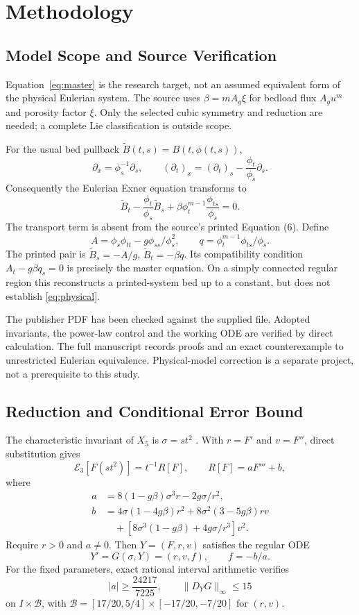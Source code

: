\documentclass[12pt,a4paper]{article}
\newcommand{\E}{\mathcal E}
\begin{document}
\newpage
\section{Methodology}
\subsection{Model Scope and Source Verification}
Equation~\eqref{eq:master} is the research target, not an assumed equivalent form of the physical Eulerian system. The source uses $\beta=mA_g\xi$ for bedload flux $A_gu^m$ and porosity factor $\xi$. Only the selected cubic symmetry and reduction are needed; a complete Lie classification is outside scope.

For the usual bed pullback $\widetilde B(t,s)=B(t,\phi(t,s))$,
\[
\partial_x=\phi_s^{-1}\partial_s,\qquad
(\partial_t)_x=(\partial_t)_s-\frac{\phi_t}{\phi_s}\partial_s.
\]
Consequently the Eulerian Exner equation transforms to
\begin{equation}
\widetilde B_t-\frac{\phi_t}{\phi_s}\widetilde B_s+
\beta\phi_t^{m-1}\frac{\phi_{ts}}{\phi_s}=0.
\label{eq:physical}
\end{equation}
The transport term is absent from the source's printed Equation (6). Define
\[
A=\phi_s\phi_{tt}-g\phi_{ss}/\phi_s^2,\qquad
q=\phi_t^{m-1}\phi_{ts}/\phi_s.
\]
The printed pair is $\widetilde B_s=-A/g$, $\widetilde B_t=-\beta q$.
Its compatibility condition $A_t-g\beta q_s=0$ is precisely the master equation. On a simply connected regular region this reconstructs a printed-system bed up to a constant, but does not establish \eqref{eq:physical}.

The publisher PDF has been checked against the supplied file. Adopted invariants, the power-law control and the working ODE are verified by direct calculation. The full manuscript records proofs and an exact counterexample to unrestricted Eulerian equivalence. Physical-model correction is a separate project, not a prerequisite to this study.

\newpage
\subsection{Reduction and Conditional Error Bound}
The characteristic invariant of $X_5$ is $\sigma=st^2$ \cite{olver}. With $r=F'$ and $v=F''$, direct substitution gives
\begin{equation}
\E_3[F(st^2)]=t^{-1}R[F],\qquad R[F]=aF'''+b,
\label{eq:lift}
\end{equation}
where
\[
\begin{aligned}
a&=8(1-g\beta)\sigma^3r-2g\sigma/r^2,\\
b&=4\sigma(1-4g\beta)r^2+8\sigma^2(3-5g\beta)rv\\
 &\quad+[8\sigma^3(1-g\beta)+4g\sigma/r^3]v^2.
\end{aligned}
\]
Require $r>0$ and $a\ne0$. Then $Y=(F,r,v)$ satisfies the regular ODE
\[
Y'=G(\sigma,Y)=(r,v,f),\qquad f=-b/a.
\]
For the fixed parameters, exact rational interval arithmetic verifies
\[
|a|\ge\frac{24217}{7225},\qquad \|D_YG\|_\infty\le15
\]
on $I\times\mathcal B$, with
$\mathcal B=[17/20,5/4]\times[-17/20,-7/20]$ for $(r,v)$.
\end{document}
